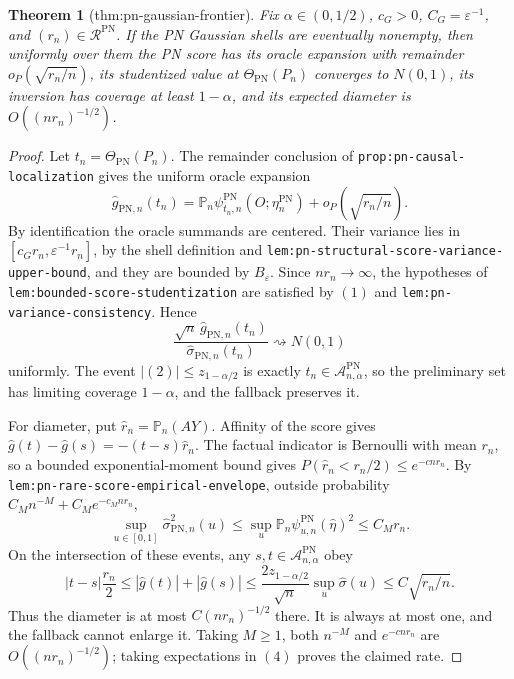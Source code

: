 \documentclass{article}
\newtheorem{theorem}{Theorem}
\begin{document}
\begin{theorem}[thm:pn-gaussian-frontier]\label{thm:pn-gaussian-frontier}
Fix \(\alpha\in(0,1/2)\), \(c_G>0\), \(C_G=\varepsilon^{-1}\), and \((r_n)\in\mathcal R^{\mathrm{PN}}\). If the PN Gaussian shells are eventually nonempty, then uniformly over them the PN score has its oracle expansion with remainder \(o_P(\sqrt{r_n/n})\), its studentized value at \(\Theta_{\mathrm{PN}}(P_n)\) converges to \(N(0,1)\), its inversion has coverage at least \(1-\alpha\), and its expected diameter is \(O((nr_n)^{-1/2})\).
\end{theorem}
\begin{proof}
Let \(t_n=\Theta_{\mathrm{PN}}(P_n)\). The remainder conclusion of \texttt{prop:pn-causal-localization} gives the uniform oracle expansion
\[\widehat g_{\mathrm{PN},n}(t_n)=\mathbb P_n\psi_{t_n,n}^{\mathrm{PN}}(O;\eta_n^{\mathrm{PN}})+o_P(\sqrt{r_n/n}).\tag{1}\]
By identification the oracle summands are centered. Their variance lies in \([c_Gr_n,\varepsilon^{-1}r_n]\), by the shell definition and \texttt{lem:pn-structural-score-variance-upper-bound}, and they are bounded by \(B_\varepsilon\). Since \(nr_n\to\infty\), the hypotheses of \texttt{lem:bounded-score-studentization} are satisfied by \((1)\) and \texttt{lem:pn-variance-consistency}. Hence
\[\frac{\sqrt n\,\widehat g_{\mathrm{PN},n}(t_n)}{\widehat\sigma_{\mathrm{PN},n}(t_n)}\rightsquigarrow N(0,1)\tag{2}\]
uniformly. The event \(|(2)|\le z_{1-\alpha/2}\) is exactly \(t_n\in\mathcal A_{n,\alpha}^{\mathrm{PN}}\), so the preliminary set has limiting coverage \(1-\alpha\), and the fallback preserves it.

For diameter, put \(\widehat r_n=\mathbb P_n(AY)\). Affinity of the score gives \(\widehat g(t)-\widehat g(s)=-(t-s)\widehat r_n\). The factual indicator is Bernoulli with mean \(r_n\), so a bounded exponential-moment bound gives \(P(\widehat r_n<r_n/2)\le e^{-cnr_n}\). By \texttt{lem:pn-rare-score-empirical-envelope}, outside probability \(C_Mn^{-M}+C_Me^{-c_Mnr_n}\),
\[\sup_{u\in[0,1]}\widehat\sigma_{\mathrm{PN},n}^2(u)\le\sup_u\mathbb P_n\psi_{u,n}^{\mathrm{PN}}(\widehat\eta)^2\le C_Mr_n.\tag{3}\]
On the intersection of these events, any \(s,t\in\mathcal A_{n,\alpha}^{\mathrm{PN}}\) obey
\[|t-s|\frac{r_n}{2}\le|\widehat g(t)|+|\widehat g(s)|\le\frac{2z_{1-\alpha/2}}{\sqrt n}\sup_u\widehat\sigma(u)\le C\sqrt{r_n/n}.\tag{4}\]
Thus the diameter is at most \(C(nr_n)^{-1/2}\) there. It is always at most one, and the fallback cannot enlarge it. Taking \(M\ge1\), both \(n^{-M}\) and \(e^{-cnr_n}\) are \(O((nr_n)^{-1/2})\); taking expectations in \((4)\) proves the claimed rate.
\end{proof}
\end{document}
